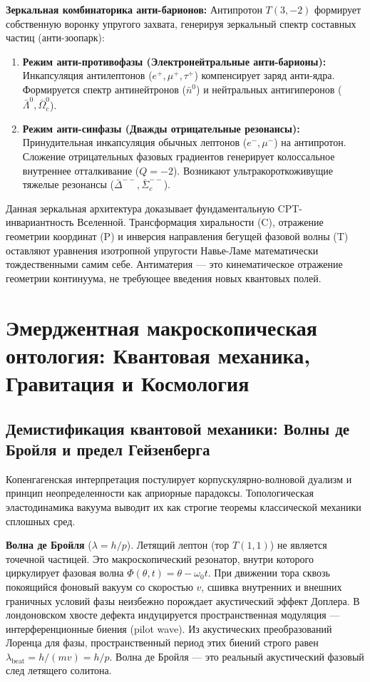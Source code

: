 \documentclass[11pt,a4paper]{article}
\begin{document}
\textbf{Зеркальная комбинаторика анти-барионов:}
Антипротон $T(3,-2)$ формирует собственную воронку упругого захвата, генерируя зеркальный спектр составных частиц (анти-зоопарк):
\begin{enumerate}
    \item \textbf{Режим анти-противофазы (Электронейтральные анти-барионы):} Инкапсуляция антилептонов ($e^+, \mu^+, \tau^+$) компенсирует заряд анти-ядра. Формируется спектр антинейтронов ($\bar{n}^0$) и нейтральных антигиперонов ($\bar{\Lambda}^0, \bar{\Omega}_c^0$).
    \item \textbf{Режим анти-синфазы (Дважды отрицательные резонансы):} Принудительная инкапсуляция обычных лептонов ($e^-, \mu^-$) на антипротон. Сложение отрицательных фазовых градиентов генерирует колоссальное внутреннее отталкивание ($Q=-2$). Возникают ультракороткоживущие тяжелые резонансы ($\bar{\Delta}^{--}, \bar{\Sigma}_c^{--}$).
\end{enumerate}

Данная зеркальная архитектура доказывает фундаментальную CPT-инвариантность Вселенной. Трансформация хиральности (C), отражение геометрии координат (P) и инверсия направления бегущей фазовой волны (T) оставляют уравнения изотропной упругости Навье-Ламе математически тождественными самим себе. Антиматерия — это кинематическое отражение геометрии континуума, не требующее введения новых квантовых полей.

\section{Эмерджентная макроскопическая онтология: Квантовая механика, Гравитация и Космология}

\subsection{Демистификация квантовой механики: Волны де Бройля и предел Гейзенберга}
Копенгагенская интерпретация постулирует корпускулярно-волновой дуализм и принцип неопределенности как априорные парадоксы. Топологическая эластодинамика вакуума выводит их как строгие теоремы классической механики сплошных сред.

\textbf{Волна де Бройля} ($\lambda = h/p$). Летящий лептон (тор $T(1,1)$) не является точечной частицей. Это макроскопический резонатор, внутри которого циркулирует фазовая волна $\Phi(\theta, t) = \theta - \omega_0 t$. При движении тора сквозь покоящийся фоновый вакуум со скоростью $v$, сшивка внутренних и внешних граничных условий фазы неизбежно порождает акустический эффект Доплера. В лондоновском хвосте дефекта индуцируется пространственная модуляция — интерференционные биения (pilot wave). Из акустических преобразований Лоренца для фазы, пространственный период этих биений строго равен $\lambda_{\text{beat}} = h / (mv) = h/p$. Волна де Бройля — это реальный акустический фазовый след летящего солитона.
\end{document}
